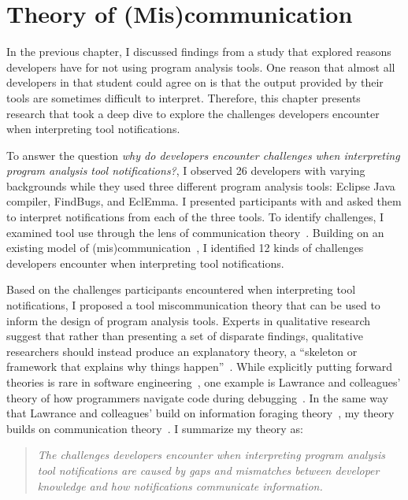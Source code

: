 \chapter{Theory of (Mis)communication}
\label{chap:theory}

In the previous chapter, I discussed findings from a study that explored reasons developers have for not using program analysis tools. One reason that almost all developers in that student could agree on is that the output provided by their tools are sometimes difficult to interpret.
Therefore, this chapter presents research that took a deep dive to explore the challenges developers encounter when interpreting tool notifications.

To answer the question \emph{why do developers encounter challenges when interpreting program analysis tool notifications?}, I observed 26 developers with varying backgrounds while they used three different program analysis tools: Eclipse Java compiler, FindBugs, and EclEmma. I presented participants with and asked them to interpret notifications from each of the three tools. 
To identify challenges, I examined tool use through the lens of communication theory~\cite{bowman1987modeling}.
Building on an existing model of (mis)communication~\cite{mustajoki2008modelling}, I identified 12 kinds of challenges developers encounter when interpreting tool notifications.

Based on the challenges participants encountered when interpreting tool notifications, I proposed a tool miscommunication theory that can be used to inform the design of program analysis tools.
Experts in qualitative research suggest that rather than presenting a set of disparate findings, qualitative researchers should instead produce an explanatory theory, a ``skeleton or framework that explains why things happen''~\cite{corbin2014basics}. While explicitly putting forward theories is rare in software engineering~\cite{hannay2007systematic}, one example is Lawrance and colleagues' theory of how programmers navigate code during debugging~\cite{lawrance2013programmers}. In the same way that Lawrance and colleagues' build on 
information foraging theory~\cite{pirolli1999information}, my theory builds on communication theory~\cite{bowman1987modeling}.
I summarize my theory as:

\begin{quotation}
	\noindent
	\emph{The challenges developers encounter when interpreting program analysis tool notifications are caused by gaps and mismatches between developer knowledge and how notifications communicate information.}
\end{quotation}

